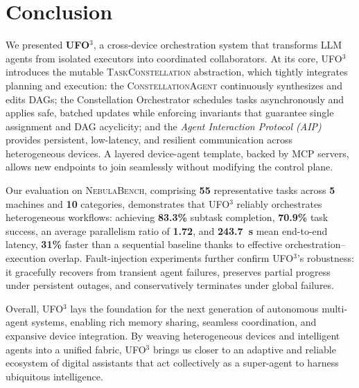 \documentclass[10pt]{article} %
\newcommand{\ufo}{\textsc{UFO}$^3$\xspace}
\newcommand{\cagent}{\textsc{ConstellationAgent}\xspace}
\newcommand{\bench}{\textsc{NebulaBench}\xspace}
\newcommand{\TaskConstellation}{\textsc{TaskConstellation}\xspace}
\begin{document}

\section{Conclusion}
\label{sec:conclusion}
We presented \textbf{\ufo}, a cross-device orchestration system that transforms LLM agents from isolated executors into coordinated collaborators. At its core, \ufo introduces the mutable \TaskConstellation abstraction, which tightly integrates planning and execution: the \cagent continuously synthesizes and edits DAGs; the Constellation Orchestrator schedules tasks asynchronously and applies safe, batched updates while enforcing invariants that guarantee single assignment and DAG acyclicity; and the \emph{Agent Interaction Protocol (AIP)} provides persistent, low-latency, and resilient communication across heterogeneous devices. A layered device-agent template, backed by MCP servers, allows new endpoints to join seamlessly without modifying the control plane.

Our evaluation on \bench, comprising \textbf{55} representative tasks across \textbf{5} machines and \textbf{10} categories, demonstrates that \ufo reliably orchestrates heterogeneous workflows: achieving \textbf{83.3\%} subtask completion, \textbf{70.9\%} task success, an average parallelism ratio of \textbf{1.72}, and \textbf{243.7~s} mean end-to-end latency, \textbf{31\%} faster than a sequential baseline thanks to effective orchestration–execution overlap. Fault-injection experiments further confirm \ufo's robustness: it gracefully recovers from transient agent failures, preserves partial progress under persistent outages, and conservatively terminates under global failures.

Overall, \ufo lays the foundation for the next generation of autonomous multi-agent systems, enabling rich memory sharing, seamless coordination, and expansive device integration. By weaving heterogeneous devices and intelligent agents into a unified fabric, \ufo brings us closer to an adaptive and reliable ecosystem of digital assistants that act collectively as a super-agent to harness ubiquitous intelligence.





\end{document}
